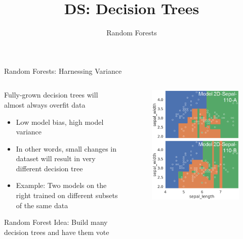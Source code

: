 \documentclass[aspectratio=169]{../latex_main/tntbeamer}  %
\title[Random Forest]{DS: Decision Trees}
\subtitle{Random Forests}
\begin{document}
	
	\maketitle
	\begin{frame}[c]{Random Forests: Harnessing Variance}
	    \begin{columns}
	        \begin{column}{.5\textwidth}
	                Fully-grown decision trees will almost always overfit data
	                \begin{itemize}
	                    \item Low model bias, high model variance
	                    \item In other words, small changes in dataset will result in very different decision tree
	                    \item Example: Two models on the right trained on different subsets of the same data
	                \end{itemize}
	                
	                \alert{Random Forest Idea:} Build many decision trees and have them vote
	        \end{column}
	        
	        \begin{column}{.5\textwidth}
	                \begin{figure}
	                    \centering
	                    \includegraphics[scale=.35]{Bild55}
	                \end{figure}
	        \end{column}
	    \end{columns}
	\end{frame}
	
\end{document}
